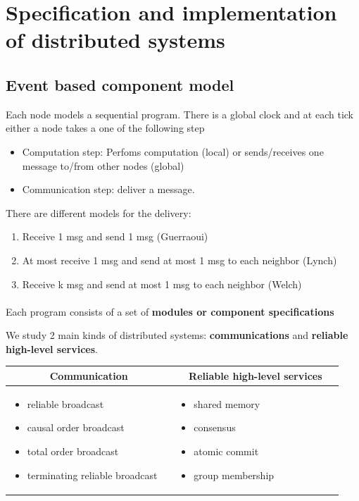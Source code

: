 \section{Specification and implementation of distributed systems}

\subsection{Event based component model}
Each node models a sequential program. There is a global clock
and at each tick either a node takes a one of the following step
\begin{itemize}
	\item Computation step: Perfoms computation (local) or
	sends/receives one message to/from other nodes (global)
	\item Communication step: deliver a message.
\end{itemize}
There are different models for the delivery:
\begin{enumerate}
    \item Receive 1 msg and send 1 msg (Guerraoui)
    \item At most receive 1 msg and send at most 1 msg to each neighbor (Lynch)
    \item Receive k msg and send at most 1 msg to each neighbor (Welch)
\end{enumerate}


\paragraph{ }
Each program consists of a set of \textbf{modules or component
specifications}

We study 2 main kinds of distributed systems: \textbf{communications} and
\textbf{reliable high-level services}.

\begin{table}[!ht]
    \begin{tabular}{p{0.475\linewidth}p{0.475\linewidth}}
        \toprule
        \multicolumn{1}{c}{\bf Communication} & \multicolumn{1}{c}{\bf Reliable high-level services} \\
        \toprule
        \begin{itemize}
            \item reliable broadcast
            \item causal order broadcast
            \item total order broadcast
            \item terminating reliable broadcast
        \end{itemize}
        &
        \begin{itemize}
            \item shared memory
            \item consensus
            \item atomic commit
            \item group membership
        \end{itemize} \\
        \bottomrule
    \end{tabular}
\end{table}
\FloatBarrier{}

